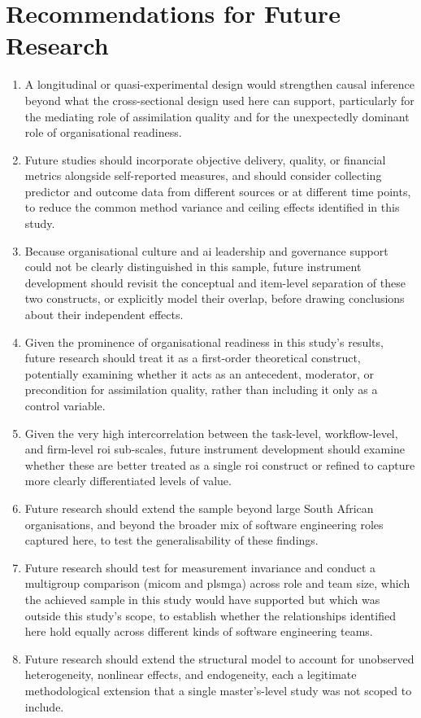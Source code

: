 \section{Recommendations for Future Research}
\label{sec:Recommendations for Future Research}
\begin{enumerate}
	\item A longitudinal or quasi-experimental design would strengthen causal inference beyond what the cross-sectional design used here can support, particularly for the mediating role of assimilation quality and for the unexpectedly dominant role of organisational readiness.
	\item Future studies should incorporate objective delivery, quality, or financial metrics alongside self-reported measures, and should consider collecting predictor and outcome data from different sources or at different time points, to reduce the common method variance and ceiling effects identified in this study.
	\item Because organisational culture and \gls{ai} leadership and governance support could not be clearly distinguished in this sample, future instrument development should revisit the conceptual and item-level separation of these two constructs, or explicitly model their overlap, before drawing conclusions about their independent effects.
	\item Given the prominence of organisational readiness in this study's results, future research should treat it as a first-order theoretical construct, potentially examining whether it acts as an antecedent, moderator, or precondition for assimilation quality, rather than including it only as a control variable.
	\item Given the very high intercorrelation between the task-level, workflow-level, and firm-level \gls{roi} sub-scales, future instrument development should examine whether these are better treated as a single \gls{roi} construct or refined to capture more clearly differentiated levels of value.
	\item Future research should extend the sample beyond large South African organisations, and beyond the broader mix of software engineering roles captured here, to test the generalisability of these findings.
	\item Future research should test for measurement invariance and conduct a multigroup comparison (\gls{micom} and \gls{plsmga}) across role and team size, which the achieved sample in this study would have supported but which was outside this study's scope, to establish whether the relationships identified here hold equally across different kinds of software engineering teams.
	\item Future research should extend the structural model to account for unobserved heterogeneity, nonlinear effects, and endogeneity, each a legitimate methodological extension that a single master's-level study was not scoped to include.
\end{enumerate}

